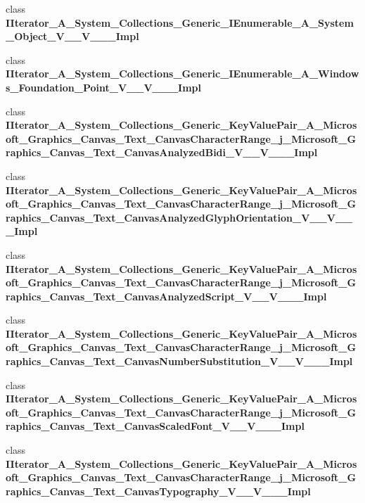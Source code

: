 \begin{DoxyCompactItemize}
\item 
class {\bfseries I\+Iterator\+\_\+\+A\+\_\+\+System\+\_\+\+Collections\+\_\+\+Generic\+\_\+\+I\+Enumerable\+\_\+\+A\+\_\+\+System\+\_\+\+Object\+\_\+\+V\+\_\+\+\_\+\+V\+\_\+\+\_\+\+\_\+\+Impl}
\item 
class {\bfseries I\+Iterator\+\_\+\+A\+\_\+\+System\+\_\+\+Collections\+\_\+\+Generic\+\_\+\+I\+Enumerable\+\_\+\+A\+\_\+\+Windows\+\_\+\+Foundation\+\_\+\+Point\+\_\+\+V\+\_\+\+\_\+\+V\+\_\+\+\_\+\+\_\+\+Impl}
\item 
class {\bfseries I\+Iterator\+\_\+\+A\+\_\+\+System\+\_\+\+Collections\+\_\+\+Generic\+\_\+\+Key\+Value\+Pair\+\_\+\+A\+\_\+\+Microsoft\+\_\+\+Graphics\+\_\+\+Canvas\+\_\+\+Text\+\_\+\+Canvas\+Character\+Range\+\_\+j\+\_\+\+Microsoft\+\_\+\+Graphics\+\_\+\+Canvas\+\_\+\+Text\+\_\+\+Canvas\+Analyzed\+Bidi\+\_\+\+V\+\_\+\+\_\+\+V\+\_\+\+\_\+\+\_\+\+Impl}
\item 
class {\bfseries I\+Iterator\+\_\+\+A\+\_\+\+System\+\_\+\+Collections\+\_\+\+Generic\+\_\+\+Key\+Value\+Pair\+\_\+\+A\+\_\+\+Microsoft\+\_\+\+Graphics\+\_\+\+Canvas\+\_\+\+Text\+\_\+\+Canvas\+Character\+Range\+\_\+j\+\_\+\+Microsoft\+\_\+\+Graphics\+\_\+\+Canvas\+\_\+\+Text\+\_\+\+Canvas\+Analyzed\+Glyph\+Orientation\+\_\+\+V\+\_\+\+\_\+\+V\+\_\+\+\_\+\+\_\+\+Impl}
\item 
class {\bfseries I\+Iterator\+\_\+\+A\+\_\+\+System\+\_\+\+Collections\+\_\+\+Generic\+\_\+\+Key\+Value\+Pair\+\_\+\+A\+\_\+\+Microsoft\+\_\+\+Graphics\+\_\+\+Canvas\+\_\+\+Text\+\_\+\+Canvas\+Character\+Range\+\_\+j\+\_\+\+Microsoft\+\_\+\+Graphics\+\_\+\+Canvas\+\_\+\+Text\+\_\+\+Canvas\+Analyzed\+Script\+\_\+\+V\+\_\+\+\_\+\+V\+\_\+\+\_\+\+\_\+\+Impl}
\item 
class {\bfseries I\+Iterator\+\_\+\+A\+\_\+\+System\+\_\+\+Collections\+\_\+\+Generic\+\_\+\+Key\+Value\+Pair\+\_\+\+A\+\_\+\+Microsoft\+\_\+\+Graphics\+\_\+\+Canvas\+\_\+\+Text\+\_\+\+Canvas\+Character\+Range\+\_\+j\+\_\+\+Microsoft\+\_\+\+Graphics\+\_\+\+Canvas\+\_\+\+Text\+\_\+\+Canvas\+Number\+Substitution\+\_\+\+V\+\_\+\+\_\+\+V\+\_\+\+\_\+\+\_\+\+Impl}
\item 
class {\bfseries I\+Iterator\+\_\+\+A\+\_\+\+System\+\_\+\+Collections\+\_\+\+Generic\+\_\+\+Key\+Value\+Pair\+\_\+\+A\+\_\+\+Microsoft\+\_\+\+Graphics\+\_\+\+Canvas\+\_\+\+Text\+\_\+\+Canvas\+Character\+Range\+\_\+j\+\_\+\+Microsoft\+\_\+\+Graphics\+\_\+\+Canvas\+\_\+\+Text\+\_\+\+Canvas\+Scaled\+Font\+\_\+\+V\+\_\+\+\_\+\+V\+\_\+\+\_\+\+\_\+\+Impl}
\item 
class {\bfseries I\+Iterator\+\_\+\+A\+\_\+\+System\+\_\+\+Collections\+\_\+\+Generic\+\_\+\+Key\+Value\+Pair\+\_\+\+A\+\_\+\+Microsoft\+\_\+\+Graphics\+\_\+\+Canvas\+\_\+\+Text\+\_\+\+Canvas\+Character\+Range\+\_\+j\+\_\+\+Microsoft\+\_\+\+Graphics\+\_\+\+Canvas\+\_\+\+Text\+\_\+\+Canvas\+Typography\+\_\+\+V\+\_\+\+\_\+\+V\+\_\+\+\_\+\+\_\+\+Impl}

\end{DoxyCompactItemize}
